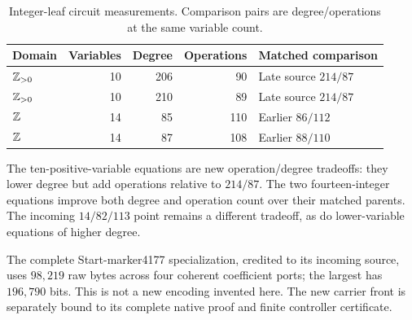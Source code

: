 \begin{table}[ht]
\centering\small
\begin{tabular}{lrrrl}
\toprule
Domain & Variables & Degree & Operations & Matched comparison\\
\midrule
$\mathbb Z_{>0}$ &10&206&90&Late source $214/87$\\
$\mathbb Z_{>0}$ &10&210&89&Late source $214/87$\\
$\mathbb Z$ &14&85&110&Earlier $86/112$\\
$\mathbb Z$ &14&87&108&Earlier $88/110$\\
\bottomrule
\end{tabular}
\caption{Integer-leaf circuit measurements. Comparison pairs are
degree/operations at the same variable count.}
\end{table}
The ten-positive-variable equations are new operation/degree tradeoffs:
they lower degree but add operations relative to $214/87$. The two
fourteen-integer equations improve both degree and operation count over
their matched parents. The incoming $14/82/113$ point remains a different
tradeoff, as do lower-variable equations of higher degree.

The complete Start-marker4177 specialization, credited to its incoming
source, uses $98{,}219$ raw bytes across four coherent coefficient ports;
the largest has $196{,}790$ bits. This is not a new encoding invented here.
The new carrier front is separately bound to its complete native proof
and finite controller certificate.
